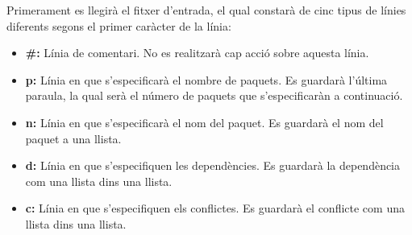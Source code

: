 \documentclass[../informe.tex]{subfiles}
\begin{document}
Primerament es llegirà el fitxer d'entrada, el qual constarà de cinc tipus de línies diferents segons el primer caràcter de la línia:

\begin{itemize}
  \item \textbf{\#:} Línia de comentari. No es realitzarà cap acció sobre aquesta línia.
  \item \textbf{p:} Línia en que s'especificarà el nombre de paquets. Es guardarà l'última paraula, la qual serà el número de paquets que s'especificaràn a continuació.
  \item \textbf{n:} Línia en que s'especificarà el nom del paquet. Es guardarà el nom del paquet a una llista.
  \item \textbf{d:} Línia en que s'especifiquen les dependències. Es guardarà la dependència com una llista dins una llista.
  \item \textbf{c:} Línia en que s'especifiquen els conflictes. Es guardarà el conflicte com una llista dins una llista.
\end{itemize}
\end{document}
